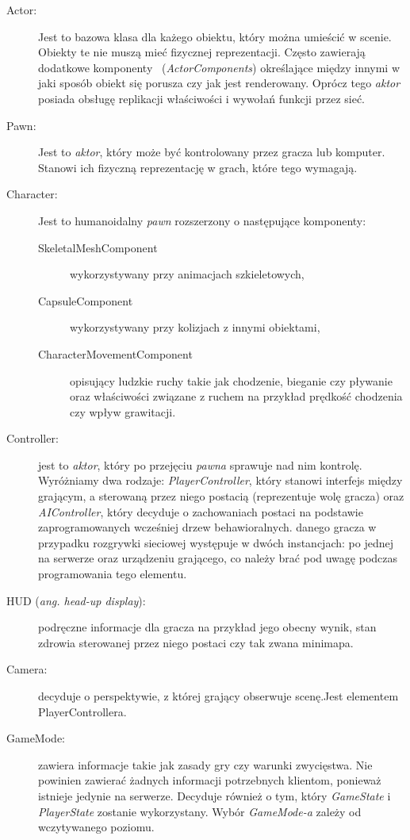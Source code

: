 \documentclass[multip]{SGGW-thesis}
\begin{document}
\begin{description}
\item[Actor:]Jest to bazowa klasa dla każego obiektu, który można umieścić w scenie. Obiekty te nie muszą mieć fizycznej reprezentacji. Często zawierają dodatkowe komponenty ~({\em ActorComponents}) określające między innymi w jaki sposób obiekt się porusza czy jak jest renderowany. Oprócz tego {\em aktor} posiada obsługę replikacji właściwości i wywołań funkcji przez sieć.
\item[Pawn:]Jest to {\em aktor}, który może być kontrolowany przez gracza lub komputer. Stanowi ich fizyczną reprezentację w grach, które tego wymagają.
\item[Character:]Jest to humanoidalny {\em pawn} rozszerzony o następujące komponenty:
	\begin{description}
	\item[SkeletalMeshComponent] wykorzystywany przy animacjach szkieletowych,
	\item[CapsuleComponent] wykorzystywany przy kolizjach z innymi obiektami,
	\item[CharacterMovementComponent] opisujący ludzkie ruchy takie jak chodzenie, bieganie czy pływanie oraz właściwości związane z ruchem na przykład prędkość chodzenia czy wpływ grawitacji.
	\end{description}
\item[Controller:] jest to {\em aktor}, który po przejęciu {\em pawna} sprawuje nad nim kontrolę. Wyróżniamy dwa rodzaje: {\em PlayerController}, który stanowi interfejs między grającym, a sterowaną przez niego postacią (reprezentuje wolę gracza) oraz {\em AIController}, który decyduje o zachowaniach postaci na podstawie zaprogramowanych wcześniej drzew behawioralnych.
 danego gracza w przypadku rozgrywki sieciowej występuje w dwóch instancjach: po jednej na serwerze oraz urządzeniu grającego, co należy brać pod uwagę podczas programowania tego elementu.
\item[HUD ({\em ang. head-up display}):] podręczne informacje dla gracza na przykład jego obecny wynik, stan zdrowia sterowanej przez niego postaci czy tak zwana minimapa.
\item[Camera:] decyduje o perspektywie, z której grający obserwuje scenę.\newline Jest elementem PlayerControllera.
\item[GameMode:] zawiera informacje takie jak zasady gry czy warunki zwycięstwa. Nie powinien zawierać żadnych informacji potrzebnych klientom, ponieważ istnieje jedynie na serwerze. Decyduje również o tym, który {\em GameState} i {\em PlayerState} zostanie wykorzystany. Wybór {\em GameMode-a} zależy od wczytywanego poziomu.

\end{description}
\end{document}
